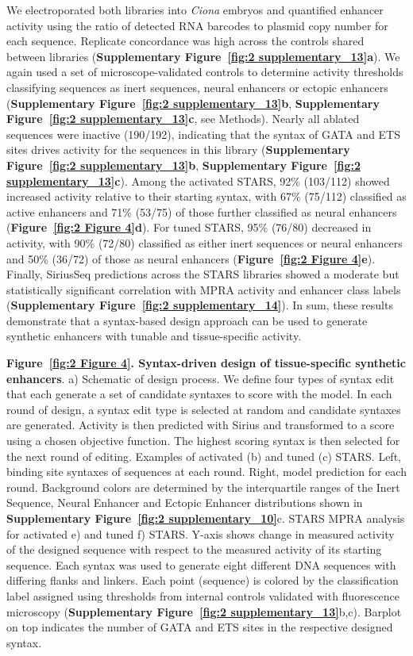 We electroporated both libraries into \textit{Ciona} embryos and quantified enhancer activity using the ratio of detected RNA barcodes to plasmid copy number for each sequence. Replicate concordance was high across the controls shared between libraries (\textbf{Supplementary Figure~\ref{fig:2 supplementary_13}a}). We again used a set of microscope-validated controls to determine activity thresholds classifying sequences as inert sequences, neural enhancers or ectopic enhancers (\textbf{Supplementary Figure~\ref{fig:2 supplementary_13}b}, \textbf{Supplementary Figure~\ref{fig:2 supplementary_13}c}, see Methods). Nearly all ablated sequences were inactive (190/192), indicating that the syntax of GATA and ETS sites drives activity for the sequences in this library (\textbf{Supplementary Figure~\ref{fig:2 supplementary_13}b}, \textbf{Supplementary Figure~\ref{fig:2 supplementary_13}c}). Among the activated STARS, 92\% (103/112) showed increased activity relative to their starting syntax, with 67\% (75/112) classified as active enhancers and 71\% (53/75) of those further classified as neural enhancers (\textbf{Figure~\ref{fig:2 Figure 4}d}). For tuned STARS, 95\% (76/80) decreased in activity, with 90\% (72/80) classified as either inert sequences or neural enhancers and 50\% (36/72) of those as neural enhancers (\textbf{Figure~\ref{fig:2 Figure 4}e}). Finally, SiriusSeq predictions across the STARS libraries showed a moderate but statistically significant correlation with MPRA activity and enhancer class labels (\textbf{Supplementary Figure~\ref{fig:2 supplementary_14}}). In sum, these results demonstrate that a syntax-based design approach can be used to generate synthetic enhancers with tunable and tissue-specific activity.

\clearpage

\thispagestyle{plain}
\noindent
\textbf{Figure~\ref{fig:2 Figure 4}. Syntax-driven design of tissue-specific synthetic enhancers}. a) Schematic of design process. We define four types of syntax edit that each generate a set of candidate syntaxes to score with the model. In each round of design, a syntax edit type is selected at random and candidate syntaxes are generated. Activity is then predicted with Sirius and transformed to a score using a chosen objective function. The highest scoring syntax is then selected for the next round of editing. Examples of activated (b) and tuned (c) STARS. Left, binding site syntaxes of sequences at each round. Right, model prediction for each round. Background colors are determined by the interquartile ranges of the Inert Sequence, Neural Enhancer and Ectopic Enhancer distributions shown in \textbf{Supplementary Figure~\ref{fig:2 supplementary_10}}c. STARS MPRA analysis for activated e) and tuned f) STARS. Y-axis shows change in measured activity of the designed sequence with respect to the measured activity of its starting sequence. Each syntax was used to generate eight different DNA sequences with differing flanks and linkers. Each point (sequence) is colored by the classification label assigned using thresholds from internal controls validated with fluorescence microscopy (\textbf{Supplementary Figure~\ref{fig:2 supplementary_13}}b,c). Barplot on top indicates the number of GATA and ETS sites in the respective designed syntax.

